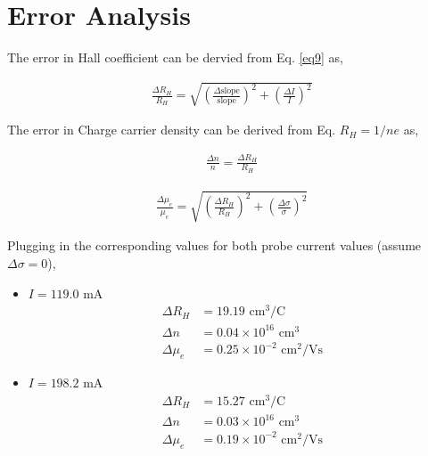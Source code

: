 \section{Error Analysis}

The error in Hall coefficient can be dervied from Eq. \ref{eq9} as, \vspace{-1em}

\begin{align}
    \frac{\Delta R_H}{R_H} = \sqrt{\left(\frac{\Delta\text{slope}}{\text{slope}}\right)^2 + \left(\frac{\Delta I}{I}\right)^2}
\end{align}

The error in Charge carrier density can be derived from Eq. $R_H=1/ne$ as, 

\begin{align}
    \frac{\Delta n}{n} = \frac{\Delta R_H}{R_H}
\end{align}

\begin{align}
    \frac{\Delta \mu_e}{\mu_e} = \sqrt{\left(\frac{\Delta R_H}{R_H}\right)^2 + \left(\frac{\Delta \sigma}{\sigma}\right)^2}
\end{align}

Plugging in the corresponding values for both probe current values (assume $\Delta \sigma=0$), 

\begin{itemize}
    \item $I=119.0$ mA
    \begin{align*}
        \Delta R_H &= 19.19 \text{ cm}^3/\text{C}\\
        \Delta n &= 0.04 \times 10^{16} \text{ cm}^3\\
        \Delta \mu_e &= 0.25 \times 10^{-2} \text{ cm}^2/\text{Vs}
    \end{align*}
    \item $I=198.2$ mA
    \begin{align*}
        \Delta R_H &= 15.27 \text{ cm}^3/\text{C}\\
        \Delta n &= 0.03 \times 10^{16} \text{ cm}^3\\
        \Delta \mu_e &= 0.19 \times 10^{-2} \text{ cm}^2/\text{Vs}
    \end{align*}
\end{itemize}




